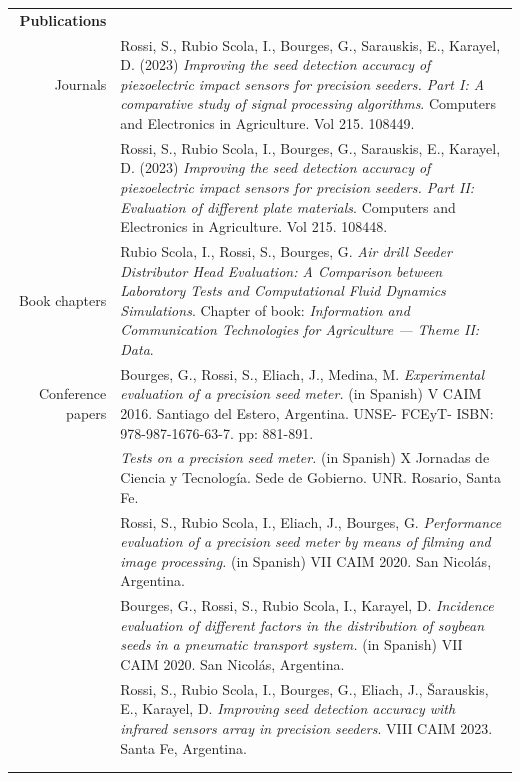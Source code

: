 \documentclass[a4paper,10pt, sans]{article}
\begin{document}
\begin{table}[H]
\begin{tabularx}{\textwidth}{r X}
    \textbf{Publications} & {}\\ [1ex]
      {Journals} & {Rossi, S., Rubio Scola, I., Bourges, G., Sarauskis, E., Karayel, D. (2023) \textit{Improving the seed detection accuracy of piezoelectric impact sensors for
precision seeders. Part I: A comparative study of signal processing algorithms}. Computers and Electronics in Agriculture. Vol 215. 108449.} \\ [1ex]
      {} & {Rossi, S., Rubio Scola, I., Bourges, G., Sarauskis, E., Karayel, D. (2023) \textit{Improving the seed detection accuracy of piezoelectric impact sensors for precision seeders. Part II: Evaluation of different plate materials}. Computers and Electronics in Agriculture. Vol 215. 108448.} \\ 
      {Book chapters} & {Rubio Scola, I., Rossi, S., Bourges, G. \textit{Air drill Seeder Distributor Head Evaluation: A Comparison between Laboratory Tests and Computational Fluid Dynamics
Simulations}. Chapter of book: \textit{Information and Communication Technologies for Agriculture — Theme II: Data}.} \\
      {Conference papers} & Bourges, G., Rossi, S., Eliach, J., Medina, M. \textit{Experimental evaluation of a precision seed meter.} (in Spanish) V CAIM 2016. Santiago del Estero, Argentina. UNSE- FCEyT- ISBN: 978-987-1676-63-7. pp: 881-891. \\  [1ex]
      {} & \textit{Tests on a precision seed meter.} (in Spanish) X Jornadas de Ciencia y Tecnología. Sede de Gobierno. UNR. Rosario, Santa Fe. \\  [1ex]
      {} & Rossi, S., Rubio Scola, I., Eliach, J., Bourges, G. \textit{Performance evaluation of a precision seed meter by means of filming and image processing.} (in Spanish) VII CAIM 2020. San Nicolás, Argentina. \\  [1ex]
      {} & Bourges, G., Rossi, S., Rubio Scola, I., Karayel, D. \textit{Incidence evaluation of different factors in the distribution of soybean seeds in a pneumatic transport system.} (in Spanish)  VII CAIM 2020. San Nicolás, Argentina.  \\  [1ex]
      {} & {Rossi, S., Rubio Scola, I., Bourges, G., Eliach, J., Šarauskis, E., Karayel, D. \textit{Improving seed detection accuracy with infrared sensors array in precision seeders}. VIII CAIM 2023. Santa Fe, Argentina.} \\ \\ \hline \\
      

\end{tabularx}
\end{table}
\end{document}
